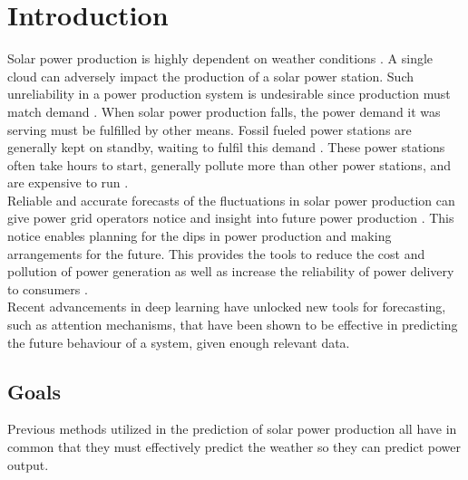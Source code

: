 \chapter{Introduction\label{cha:introduction}}

\vspace{1.5cm}

Solar power production is highly dependent on weather conditions \cite{lin_temporal_2020, lee_forecasting_2018, jaidee_very_2019, su_machine_2019, jang_solar_2016, jimenez_wrf-solar_2016, rognvaldsson_numerical_2013}. A single cloud can adversely impact the production of a solar power station. Such unreliability in a power production system is undesirable since production must match demand \cite{lee_forecasting_2018}. When solar power production falls, the power demand it was serving must be fulfilled by other means. Fossil fueled power stations are generally kept on standby, waiting to fulfil this demand \cite{lee_forecasting_2018}. These power stations often take hours to start, generally pollute more than other power stations, and are expensive to run \cite{lee_forecasting_2018}.\\
Reliable and accurate forecasts of the fluctuations in solar power production can give power grid operators notice and insight into future power production \cite{lee_forecasting_2018}. This notice enables planning for the dips in power production and making arrangements for the future. This provides the tools to reduce the cost and pollution of power generation as well as increase the reliability of power delivery to consumers \cite{lee_forecasting_2018}.\\

Recent advancements in deep learning have unlocked new tools for forecasting, such as attention mechanisms, that have been shown to be effective in predicting the future behaviour of a system, given enough relevant data.\\



 \newpage
\section{Goals}
Previous methods utilized in the prediction of solar power production all have in common that they must effectively predict the weather so they can predict power output.

